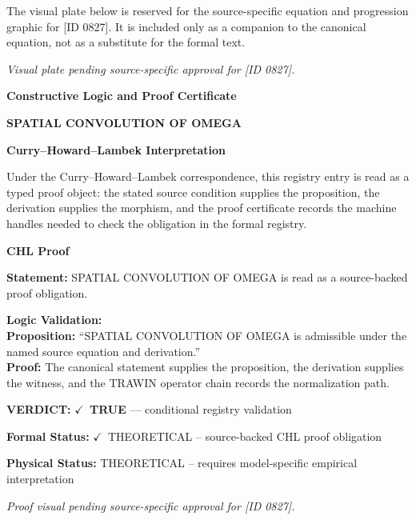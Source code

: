 \begingroup\footnotesize\sloppy
The visual plate below is reserved for the source-specific equation and progression graphic for [ID 0827]. It is included only as a companion to the canonical equation, not as a substitute for the formal text.
\par\endgroup
\begingroup\footnotesize\itshape
Visual plate pending source-specific approval for [ID 0827].
\par\endgroup

\clearpage
\begingroup\tzpsupportsetup
\noindent\textbf{\fontsize{10.8pt}{12.8pt}\selectfont [ID 0827] Constructive Logic and Proof Certificate}\par
\noindent\textbf{\fontsize{10pt}{12pt}\selectfont SPATIAL CONVOLUTION OF OMEGA}\par
\vspace{0.45em}
\begingroup
\footnotesize
\setlength{\parskip}{0.22em}
\setlength{\parindent}{0pt}
\noindent\textbf{Curry--Howard--Lambek Interpretation}\par
Under the Curry--Howard--Lambek correspondence, this registry entry is read as a typed proof
object: the stated source condition supplies the proposition, the derivation supplies the
morphism, and the proof certificate records the machine handles needed to check the obligation
in the formal registry.

\vspace{0.45em}
\noindent\textbf{CHL Proof}\par
\textbf{Statement:} SPATIAL CONVOLUTION OF OMEGA is read as a source-backed proof obligation.

\textbf{Logic Validation:}\\
\textbf{Proposition:} ``SPATIAL CONVOLUTION OF OMEGA is admissible under the named source equation and derivation.''\\
\textbf{Proof:} The canonical statement supplies the proposition, the derivation supplies the witness, and the TRAWIN operator chain records the normalization path.

\textbf{VERDICT:} \ensuremath{\checkmark}\ \textbf{TRUE} --- conditional registry validation

\textbf{Formal Status:} \ensuremath{\checkmark}\ THEORETICAL -- source-backed CHL proof obligation

\textbf{Physical Status:} THEORETICAL -- requires model-specific empirical interpretation
\par\vspace{0.45em}
\par
\vfill
\begingroup\footnotesize\itshape
Proof visual pending source-specific approval for [ID 0827].
\par\endgroup
\vfill
\endgroup
\endgroup
